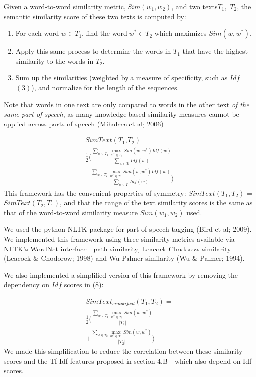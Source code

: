 \documentclass[letterpaper, 10 pt, conference]{ieeeconf}  %
\DeclareMathOperator*{\maxU}{max}
\begin{document}
Given a word-to-word similarity metric, $Sim(w_1, w_2)$, and two texts\footnotemark[3] $T_1,$ $T_2$, the semantic similarity score of these two texts is computed by:
\begin{enumerate}
\item For each word $w \in T_1$, find the word $w^* \in T_2$ which maximizes $Sim(w, w^*)$.
\item Apply this same process to determine the words in $T_1$ that have the highest similarity to the words in $T_2$. 
\item Sum up the similarities (weighted by a measure of specificity, such as $Idf$ $(3)$), and normalize for the length of the sequences. 
\end{enumerate}
Note that words in one text are only compared to words in the other text \emph{of the same part of speech}, as many knowledge-based similarity measures cannot be applied across parts of speech (Mihalcea et al; 2006).

\begin{gather*} \tag{8}
SimText(T_1,T_2) = \\ \frac{1}{2}\Big( \frac{\sum_{w \in T_1}{\maxU_{w^* \in T_2}Sim(w,w^*)Idf(w)}}{\sum_{w \in T_1}Idf(w)} \\ + \frac{\sum_{w \in T_2}{\maxU_{w^* \in T_1}Sim(w,w^*)Idf(w)}}{\sum_{w \in T_2}Idf(w)} \Big)
\end{gather*}
This framework has the convenient properties of symmetry: $SimText(T_1, T_2)$ = $SimText(T_2, T_1)$, and that the range of the text similarity scores is the same as that of the word-to-word similarity measure  $Sim(w_1, w_2)$ used. 

We used the python NLTK package for part-of-speech tagging (Bird et al; 2009). We implemented this framework using three similarity metrics available via NLTK’s WordNet interface - path similarity, Leacock-Chodorow similarity (Leacock \& Chodorow; 1998) and Wu-Palmer similarity (Wu \& Palmer; 1994). 

We also implemented a simplified version of this framework by removing the dependency on $Idf$ scores in (8):

\begin{gather*} \tag{9}
SimText_{simplified}(T_1,T_2) = \\ \frac{1}{2}\Big( \frac{\sum_{w \in T_1}{\maxU_{w^* \in T_2}Sim(w,w^*)}}{|T_1|} \\ + \frac{\sum_{w \in T_2}{\maxU_{w^* \in T_1}Sim(w,w^*)}}{|T_2|} \Big)
\end{gather*}
We made this simplification to reduce the correlation between these similarity scores and the Tf-Idf features proposed in section 4.B - which also depend on Idf scores.
\end{document}
